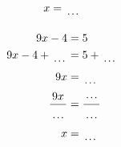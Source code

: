 \documentclass[12pt]{article}
\newcounter{minipagecount}
\begin{document}
\begin{multicols}{2}
\begin{minipage}[t]{0.45\textwidth}
\begin{align*}
        x &= \dotuline{\hspace{5mm}}\\
    \end{align*}
\end{minipage} %
\noindent{(\theminipagecount)}\hspace{0.1mm} %
\begin{minipage}[t]{0.45\textwidth} %
    \vspace{-26pt}  %
    \raggedright %
    \begin{align*} %
        9x - 4 &= 5\\
        9x - 4 + \dotuline{\hspace{5mm}} &= 5 + \dotuline{\hspace{5mm}}\\
        9x &= \dotuline{\hspace{5mm}}\\
        \frac{9x}{\dotuline{\hspace{5mm}}} &= \frac{\dotuline{\hspace{5mm}}}{\dotuline{\hspace{5mm}}}\\
        x &= \dotuline{\hspace{5mm}}\\
    \end{align*}
\end{minipage} %
\noindent{(\theminipagecount)}\hspace{0.1mm} %
\begin{minipage}[t]{0.45\textwidth} %
    \vspace{-26pt}  %

\end{minipage}
\end{multicols}
\end{document}
